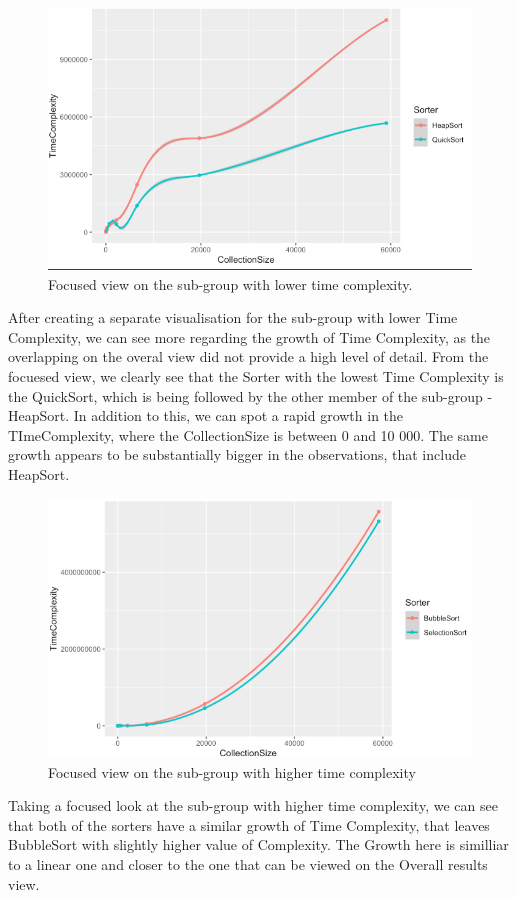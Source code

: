 \documentclass[]{report}
\begin{document}
\begin{figure}
	\centering
	\includegraphics[width=0.7\linewidth]{OverviewOfConstantTimeComplexityAlgorithms}
	\caption[Figure 3.2]{Focused view on the sub-group with lower time complexity.}
	\label{fig:overviewofconstanttimecomplexityalgorithms}
\end{figure}
\newpage	
After creating a separate visualisation for the sub-group with lower Time Complexity, we can see more regarding the growth of Time Complexity, as the overlapping on the overal view did not provide a high level of detail. From the focuesed view, we clearly see that the Sorter with the lowest Time Complexity is the QuickSort, which is being followed by the other member of the sub-group - HeapSort. In addition to this, we can spot a rapid growth in the TImeComplexity, where the CollectionSize is between 0 and 10 000. The same growth appears to be substantially bigger in the observations, that include HeapSort.

\begin{figure}
	\centering
	\includegraphics[width=0.7\linewidth]{FocusedViewOnBigTimeComplexity}
	\caption[Figure 3.3]{Focused view on the sub-group with higher time complexity}
	\label{fig:focusedviewonbigtimecomplexity}
\end{figure}
\newpage
Taking a focused look at the sub-group with higher time complexity, we can see that both of the sorters have a similar growth of Time Complexity, that leaves BubbleSort with slightly higher value of Complexity. The Growth here is similliar to a linear one and closer to the one that can be viewed on the Overall results view.
\end{document}
